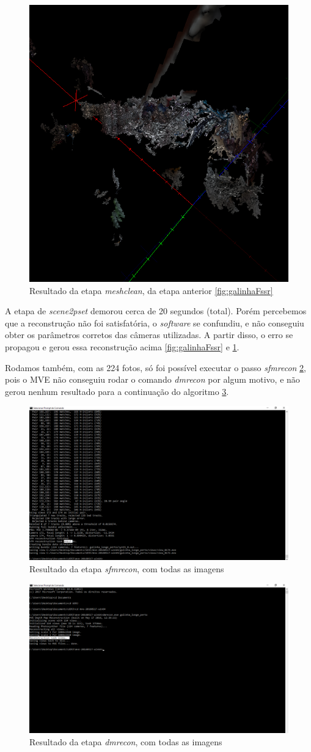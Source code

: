 \begin{figure}[!h]
	\centering
	\includegraphics[width=0.5\linewidth]{figs/galinhameshclean.png}
	\caption{%
	Resultado da etapa \emph{meshclean}, da etapa anterior \ref{fig:galinhaFssr}
	}\label{fig:galinhaMeshClean}
\end{figure}

A etapa de \emph{scene2pset} demorou cerca de 20 segundos (total). Porém percebemos que a reconstrução não foi satisfatória, o \emph{software} se confundiu, e não conseguiu obter os parâmetros corretos das câmeras utilizadas. A partir disso, o erro se propagou e gerou essa reconstrução acima \ref{fig:galinhaFssr} e \ref{fig:galinhaMeshClean}.

Rodamos também, com as 224 fotos, só foi possível executar o passo \emph{sfmrecon} \ref{fig:galinhaSfM224}, pois o MVE não conseguiu rodar o comando \emph{dmrecon} por algum motivo, e não gerou nenhum resultado para a continuação do algoritmo \ref{fig:galinhaDMR224}.

\begin{figure}[!h]
	\centering
	\includegraphics[width=0.5\linewidth]{figs/mvesfmrecongalinhapertolonge.png}
	\caption{%
	Resultado da etapa \emph{sfmrecon}, com todas as imagens
	}\label{fig:galinhaSfM224}
\end{figure}

\begin{figure}[!h]
	\centering
	\includegraphics[width=0.5\linewidth]{figs/mvedmrecongalinhapertolonge.png}
	\caption{%
	Resultado da etapa \emph{dmrecon}, com todas as imagens
	}\label{fig:galinhaDMR224}
\end{figure}

